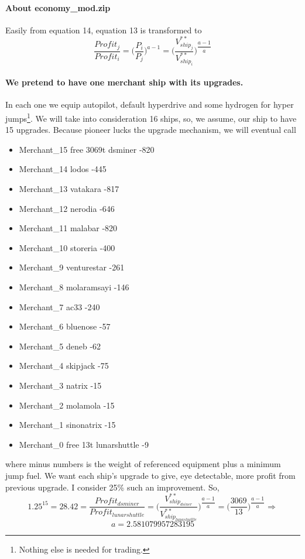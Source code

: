 \documentclass[]{article}
\begin{document}
	\paragraph{About economy\_mod.zip}
	Easily from equation 14, equation 13 is transformed to
	\begin{equation}\label{eq:profitRatio_ij}
		\dfrac{Profit_{j}}{Profit_{i}}=\Big(\dfrac{P_{i}}{P_{j}}\Big)^{a-1}=\Big(\dfrac{V^{**}_{ship_{j}}}{V^{**}_{ship_{i}}}\Big)^{\dfrac{a-1}{a}}
	\end{equation}
\paragraph{We pretend to have one merchant ship with its upgrades.} In each one we equip autopilot, default hyperdrive and some hydrogen for hyper jumps\footnote{Nothing else is needed for trading.}. We will take into consideration 16 ships, so, we assume, our ship  to have 15 upgrades.
Because pioneer lucks the upgrade mechanism, we will eventual call 
\begin{itemize}
\item Merchant\_15 free 3069t	dsminer -820
\item Merchant\_14 	lodos -445
\item Merchant\_13 	vatakara -817
\item Merchant\_12	nerodia -646
\item Merchant\_11	malabar -820
\item Merchant\_10	storeria -400
\item Merchant\_9	venturestar -261
\item Merchant\_8	molaramsayi -146
\item Merchant\_7	ac33 -240
\item Merchant\_6 	bluenose -57
\item Merchant\_5	deneb -62
\item Merchant\_4	skipjack -75
\item Merchant\_3	natrix -15
\item Merchant\_2	molamola -15
\item Merchant\_1	sinonatrix -15
\item Merchant\_0 free 13t	lunarshuttle -9
\end{itemize}
where minus numbers is the weight of referenced equipment plus a minimum jump fuel.
We want each ship's upgrade to give, eye detectable, more profit from previous upgrade. I consider 25\% such an improvement. So, \[1.25^{15}=28.42=\frac{Profit_{dsminer}}{Profit_{lunarshuttle}}=\Big(\dfrac{V^{**}_{ship_{dsiner}}}{V^{**}_{ship_{lunashuttle}}}\Big)^{\dfrac{a-1}{a}}=\Big(\dfrac{3069}{13}\Big)^{\dfrac{a-1}{a}}\Rightarrow\]\[a=2.581079957283195\]
\end{document}
